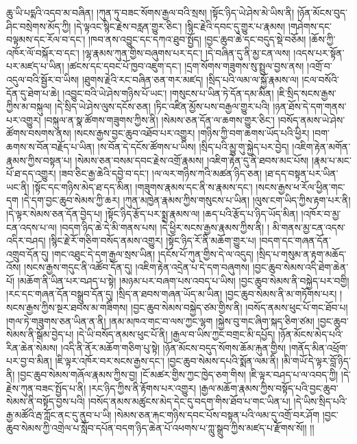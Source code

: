 ཆུ་ཡི་པདྨའི་འདབ་མ་བཞིན། །ཀུན་ཏུ་བཟང་སོགས་རྒྱལ་བའི་སྲས། །སྟོང་ཉིད་ཡེ་ཤེས་མེ་ཡིས་ནི། །ཉོན་མོངས་བུད་ཤིང་བསྲེགས་མོད་ཀྱི། །དེ་ལྟའང་སྙིང་རྗེས་བརླན་གྱུར་ཅིང་། །སྙིང་རྗེའི་དབང་དུ་གྱུར་པ་རྣམས། །གཤེགས་དང་བལྟམས་དང་རོལ་བ་དང་། །ཁབ་ནས་འབྱུང་དང་དཀའ་ཐུབ་སྤྱོད། །བྱང་ཆུབ་ཆེ་དང་བདུད་སྡེ་བཅོམ། །ཆོས་ཀྱི་འཁོར་ལོ་བསྐོར་བ་དང་། །ལྷ་རྣམས་ཀུན་གྱིས་བཞུགས་པར་དང་། །དེ་བཞིན་དུ་ནི་མྱ་ངན་ལས། །འདས་པར་སྟོན་པར་མཛད་པ་ཡིན། །ཚངས་དང་དབང་པོ་ཁྱབ་འཇུག་དང་། །དྲག་སོགས་གཟུགས་སུ་སྤྲུལ་བྱས་ནས། །འགྲོ་བ་འདུལ་བའི་སྦྱོར་བ་ཡིས། །ཐུགས་རྗེའི་རང་བཞིན་ཅན་གར་མཛད། །སྲིད་པའི་ལམ་ལ་སྐྱོ་རྣམས་ལ། །ངལ་བསོའི་དོན་དུ་ཐེག་པ་ཆེ། །འབྱུང་བའི་ཡེ་ཤེས་གཉིས་པོ་ཡང་། །གསུངས་པ་ཡིན་ཏེ་དོན་དམ་མིན། །ཇི་སྲིད་སངས་རྒྱས་ཀྱིས་མ་བསྐུལ། །དེ་སྲིད་ཡེ་ཤེས་ལུས་དངོས་ཅན། །ཏིང་འཛིན་མྱོས་པས་བརྒྱལ་གྱུར་པའི། །ཉན་ཐོས་དེ་དག་གནས་པར་འགྱུར། །བསྐུལ་ན་སྣ་ཚོགས་གཟུགས་ཀྱིས་ནི། །སེམས་ཅན་དོན་ལ་ཆགས་གྱུར་ཅིང་། །བསོད་ནམས་ཡེ་ཤེས་ཚོགས་བསགས་ནས། །སངས་རྒྱས་བྱང་ཆུབ་འཐོབ་པར་འགྱུར། །གཉིས་ཀྱི་བག་ཆགས་ཡོད་པའི་ཕྱིར། །བག་ཆགས་ས་བོན་བརྗོད་པ་ཡིན། །ས་བོན་དེ་དངོས་ཚོགས་པ་ཡིས། །སྲིད་པའི་མྱུ་གུ་སྐྱེད་པར་བྱེད། །འཇིག་རྟེན་མགོན་རྣམས་ཀྱིས་བསྟན་པ། །སེམས་ཅན་བསམ་དབང་རྗེས་འགྲོ་རྣམས། །འཇིག་རྟེན་དུ་ནི་ཐབས་མང་པོས། །རྣམ་པ་མང་པོ་ཐ་དད་འགྱུར། །ཟབ་ཅིང་རྒྱ་ཆེའི་དབྱེ་བ་དང་། །ལ་ལར་གཉིས་ཀའི་མཚན་ཉིད་ཅན། །ཐ་དད་བསྟན་པར་ཡིན་ཡང་ནི། །སྟོང་དང་གཉིས་མེད་ཐ་དད་མིན། །གཟུགས་རྣམས་དང་ནི་ས་རྣམས་དང་། །སངས་རྒྱས་ཕ་རོལ་ཕྱིན་གང་དག །དེ་དག་བྱང་ཆུབ་སེམས་ཀྱི་ཆར། །ཀུན་མཁྱེན་རྣམས་ཀྱིས་གསུངས་པ་ཡིན། །ལུས་ངག་ཡིད་ཀྱིས་རྟག་པར་ནི། །དེ་ལྟར་སེམས་ཅན་དོན་བྱེད་པ། །སྟོང་ཉིད་རྩོད་པར་སྨྲ་རྣམས་ལ། །ཆད་པའི་རྩོད་པ་ཉིད་ཡོད་མིན། །འཁོར་བ་མྱ་ངན་འདས་པ་ལ། །བདག་ཉིད་ཆེ་དེ་མི་གནས་པས། །དེ་ཕྱིར་སངས་རྒྱས་རྣམས་ཀྱིས་ནི། །
མི་གནས་མྱ་ངན་འདས་འདིར་བཤད། །སྙིང་རྗེ་རོ་གཅིག་བསོད་ནམས་འགྱུར། །སྟོང་ཉིད་རོ་ནི་མཆོག་གྱུར་པ། །བདག་དང་གཞན་དོན་འགྲུབ་དོན་དུ། །གང་འཐུང་དེ་དག་རྒྱལ་སྲས་ཡིན། །དངོས་པོ་ཀུན་གྱིས་དེ་ལ་འདུད། །སྲིད་པ་གསུམ་ན་རྟག་མཆོད་འོས། །སངས་རྒྱས་གདུང་ནི་འཚོབ་དོན་དུ། །འཇིག་རྟེན་འདྲེན་པ་དེ་དག་བཞུགས། །བྱང་ཆུབ་སེམས་འདི་ཐེག་ཆེན་པོ། །མཆོག་ནི་ཡིན་པར་བཤད་པ་སྟེ། །མཉམ་པར་བཞག་པས་འབད་པ་ཡིས། །བྱང་ཆུབ་སེམས་ནི་བསྐྱེད་པར་བགྱི། །རང་དང་གཞན་དོན་བསྒྲུབ་དོན་དུ། །སྲིད་ན་ཐབས་གཞན་ཡོད་མ་ཡིན། །བྱང་ཆུབ་སེམས་ནི་མ་གཏོགས་པར། །སངས་རྒྱས་ཀྱིས་སྔར་ཐབས་མ་གཟིགས། །བྱང་ཆུབ་སེམས་བསྐྱེད་ཙམ་གྱིས་ནི། །བསོད་ནམས་ཕུང་པོ་གང་ཐོབ་པ། །གལ་ཏེ་གཟུགས་ཅན་ཡིན་ན་ནི། །ནམ་མཁའ་གང་བ་ལས་ཀྱང་ལྷག །སྐྱེས་བུ་གང་ཞིག་སྐད་ཅིག་ཙམ། །བྱང་ཆུབ་སེམས་ནི་སྒོམ་བྱེད་པ། །དེ་ཡི་བསོད་ནམས་ཕུང་པོ་ནི། །རྒྱལ་བ་ཡིས་ཀྱང་བགྲང་མི་དཔྱོད། །ཉོན་མོངས་མེད་པའི་རིན་ཆེན་སེམས། །འདི་ནི་ནོར་མཆོག་གཅིག་པུ་སྟེ། །ཉོན་མོངས་བདུད་སོགས་ཆོམ་རྐུན་གྱིས། །གནོད་མིན་འཕྲོག་པར་བྱ་བ་མིན། །ཇི་ལྟར་འཁོར་བར་སངས་རྒྱས་དང་། །བྱང་ཆུབ་སེམས་དཔའི་སྨོན་ལམ་ནི། །མི་གཡོ་དེ་ལྟར་བློ་ཉིད་ནི། །བྱང་ཆུབ་སེམས་གཞོལ་རྣམས་ཀྱིས་བྱ། །ངོ་མཚར་གྱིས་ཀྱང་ཁྱེད་ཅག་གིས། །ཇི་ལྟར་བཤད་པ་ལ་འབད་ཀྱི། །དེ་རྗེས་ཀུན་བཟང་སྤྱོད་པ་ནི། །རང་ཉིད་ཀྱིས་ནི་རྟོགས་པར་འགྱུར། །རྒྱལ་མཆོག་རྣམས་ཀྱིས་བསྟོད་པའི་བྱང་ཆུབ་སེམས་ནི་བསྟོད་བྱས་པའི། །བསོད་ནམས་མཚུངས་མེད་དེང་དུ་བདག་གིས་ཐོབ་པ་གང་ཡིན་པ། །དེ་ཡིས་སྲིད་པའི་རྒྱ་མཚོའི་རྦ་ཀློང་ནང་དུ་ནུབ་པ་ཡི། །སེམས་ཅན་རྐང་གཉིས་དབང་པོས་བསྟན་པའི་ལམ་དུ་འགྲོ་བར་ཤོག །བྱང་ཆུབ་སེམས་ཀྱི་འགྲེལ་པ་སློབ་དཔོན་བདག་ཉིད་ཆེན་པོ་འཕགས་པ་ཀླུ་སྒྲུབ་ཀྱིས་མཛད་པ་རྫོགས་སོ།། །།
